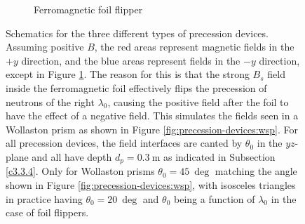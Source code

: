 \begin{figure}[htbp]
\begin{subfigure}[b]{0.3\textwidth}
		\caption{Ferromagnetic foil flipper}
		\label{fig:precession-devices:foil}
	\end{subfigure}
	\caption{Schematics for the three different types of precession devices. Assuming positive $B$, the red areas represent magnetic fields in the $+y$ direction, and the blue areas represent fields in the $-y$ direction, except in Figure \ref{fig:precession-devices:foil}. The reason for this is that the strong $B_s$ field inside the ferromagnetic foil effectively flips the precession of neutrons of the right $\lambda_0$, causing the positive field after the foil to have the effect of a negative field. This simulates the fields seen in a Wollaston prism as shown in Figure \ref{fig:precession-devices:wsp}. For all precession devices, the field interfaces are canted by $\theta_0$ in the $yz$-plane and all have depth $d_p = \SI{0.3}{\meter}$ as indicated in Subsection \ref{c3.3.4}. Only for Wollaston prisms $\theta_0 = \SI{45}{\deg}$ matching the angle shown in Figure \ref{fig:precession-devices:wsp}, with isosceles triangles in practice having $\theta_0 = \SI{20}{\deg}$ and $\theta_0$ being a function of $\lambda_0$ in the case of foil flippers.}
	\label{fig:precession-devices}
\end{figure}

